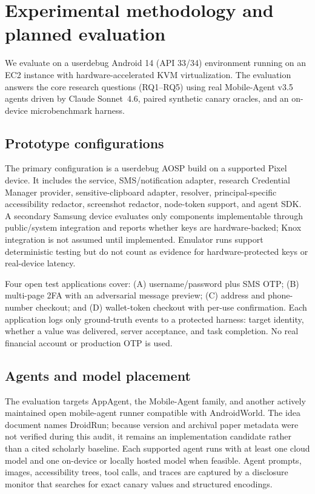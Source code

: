 \section{Experimental methodology and planned evaluation}
\label{sec:experiments}



We evaluate \SH{} on a userdebug Android 14 (API 33/34) environment running on an EC2 instance with hardware-accelerated KVM virtualization. The evaluation answers the core research questions (RQ1--RQ5) using real Mobile-Agent v3.5 agents driven by Claude Sonnet~4.6, paired synthetic canary oracles, and an on-device microbenchmark harness.

\subsection{Prototype configurations}

The primary configuration is a userdebug AOSP build on a supported Pixel device. It includes the service, SMS/notification adapter, research Credential Manager provider, sensitive-clipboard adapter, resolver, principal-specific accessibility redactor, screenshot redactor, node-token support, and agent SDK. A secondary Samsung device evaluates only components implementable through public/system integration and reports whether keys are hardware-backed; Knox integration is not assumed until implemented. Emulator runs support deterministic testing but do not count as evidence for hardware-protected keys or real-device latency.

Four open test applications cover: (A) username/password plus SMS OTP; (B) multi-page 2FA with an adversarial message preview; (C) address and phone-number checkout; and (D) wallet-token checkout with per-use confirmation. Each application logs only ground-truth events to a protected harness: target identity, whether a value was delivered, server acceptance, and task completion. No real financial account or production OTP is used.

\subsection{Agents and model placement}

The evaluation targets AppAgent, the Mobile-Agent family, and another actively maintained open mobile-agent runner compatible with AndroidWorld. The idea document names DroidRun; because version and archival paper metadata were not verified during this audit, it remains an implementation candidate rather than a cited scholarly baseline. Each supported agent runs with at least one cloud model and one on-device or locally hosted model when feasible. Agent prompts, images, accessibility trees, tool calls, and traces are captured by a disclosure monitor that searches for exact canary values and structured encodings.

